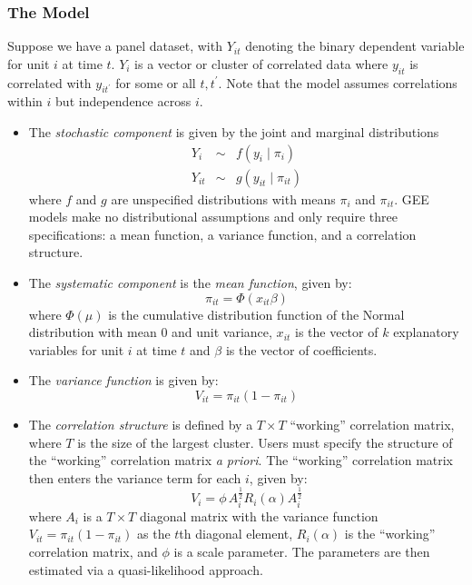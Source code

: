 \subsubsection{The Model}
Suppose we have a panel dataset, with $Y_{it}$ denoting the binary dependent variable for unit $i$ at time $t$.  $Y_{i}$ is a vector or cluster of correlated data
where $y_{it}$ is correlated with $y_{it^\prime}$ for some or all
$t, t^\prime$.  Note that the model assumes correlations within $i$ but independence across $i$.  

\begin{itemize}

\item The \emph{stochastic component} is given by the joint and marginal distributions
\begin{eqnarray*}
Y_{i} &\sim& f(y_{i} \mid \pi_{i})\\
Y_{it} &\sim& g(y_{it} \mid \pi_{it})
\end{eqnarray*}
where $f$ and $g$ are unspecified distributions with means $\pi_{i}$ and $\pi_{it}$.  GEE models make no distributional assumptions and only require three specifications: a mean function, a variance function, and a correlation structure.

\item The \emph{systematic component} is the \textit{mean function}, given by:
\begin{equation*}
\pi_{it} = \Phi(x_{it} \beta)
\end{equation*}
where $\Phi(\mu)$ is the cumulative distribution function of the Normal distribution with mean 0 and unit variance, $x_{it}$ is the vector of $k$ explanatory variables for unit $i$ at time $t$
and $\beta$ is the vector of coefficients.

\item The \textit{variance function} is given by: 
\begin{equation*}
V_{it} = \pi_{it} (1-\pi_{it})
\end{equation*} 

\item The \textit{correlation structure} is defined by a $T \times T$ ``working'' correlation matrix, where $T$ is the size of the largest cluster.  Users must specify the structure of the ``working'' correlation matrix \textit{a priori}.  The ``working'' correlation matrix then enters the variance term for each $i$, given by:
\begin{equation*}
V_{i} = \phi \, A_{i}^{\frac{1}{2}} R_{i}(\alpha) A_{i}^{\frac{1}{2}}
\end{equation*}
where $A_{i}$ is a $T \times T$ diagonal matrix with the variance function $V_{it} = \pi_{it} (1-\pi_{it})$ as the $t$th diagonal element, $R_{i}(\alpha)$ is the ``working'' correlation matrix, and $\phi$ is a scale parameter.  The parameters are then estimated via a quasi-likelihood approach.


\end{itemize}
